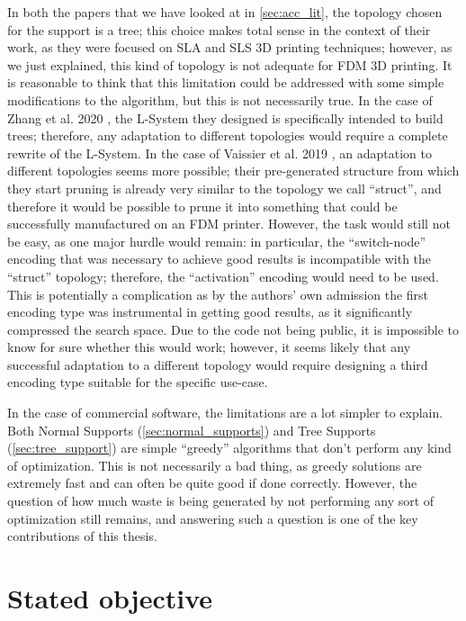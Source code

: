 In both the papers that we have looked at in \cref{sec:acc_lit}, the topology chosen for the support
is a tree; this choice makes total sense in the context of their work, as they were focused on SLA and SLS 3D printing
techniques; however, as we just explained, this kind of topology is not adequate for FDM 3D printing.
It is reasonable to think that this limitation could be addressed with some simple modifications to the algorithm,
but this is not necessarily true. In the case of Zhang et al. 2020 \cite{ZHANG2020117}, the L-System they designed is
specifically intended to build trees; therefore, any adaptation to different topologies would require a complete
rewrite of the L-System.
In the case of Vaissier et al. 2019 \cite{VAISSIER201911}, an adaptation to different topologies seems more possible;
their pre-generated structure from which they start pruning is already very similar to the topology we call ``struct'',
and therefore it would be possible to prune it into something that could be successfully manufactured on an FDM printer.
However, the task would still not be easy, as one major hurdle would remain: in particular, the ``switch-node'' encoding
that was necessary to achieve good results is incompatible with the ``struct'' topology; therefore, the ``activation''
encoding would need to be used. This is potentially a complication as by the authors' own admission the first encoding type
was instrumental in getting good results, as it significantly compressed the search space. Due to the code
not being public, it is impossible to know for sure whether this would work; however, it seems likely that
any successful adaptation to a different topology would require designing a third encoding type suitable for the specific
use-case.

In the case of commercial software, the limitations are a lot simpler to explain.
Both Normal Supports (\cref{sec:normal_supports}) and Tree Supports (\cref{sec:tree_support}) are simple ``greedy''
algorithms that don't perform any kind of optimization. This is not necessarily a bad thing, as greedy solutions are
extremely fast and can often be quite good if done correctly. However, the question of how much waste is being generated
by not performing any sort of optimization still remains, and answering such a question is one of the key contributions
of this thesis.



\section{Stated objective}
\label{sec:obj}

